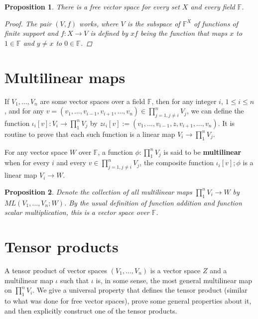 \documentclass[a4paper,14pt]{article}
\newtheorem*{prop}{Proposition}
\begin{document}
\begin{prop}
There is a free vector space for every set $X$ and every field $\mathbb{F}$.
\begin{proof}
    The pair $(V, f)$ works, where $V$ is the subspace of $\mathbb{F}^X$ of functions of finite support and $f: X \to V$ is defined by $xf$ being the function that maps $x$ to $1 \in \mathbb{F}$ and $y \neq x$ to $0 \in \mathbb{F}$.
\end{proof}
\end{prop}

\section{Multilinear maps}
If $V_1, \ldots, V_n$ are some vector spaces over a field $\mathbb{F}$, then for any integer $i$, $1 \leq i \leq n$, and for any $v = (v_1, \ldots, v_{i-1}, v_{i+1}, \ldots, v_n) \in \prod_{j=1, j \neq i}^n V_j$, we can define the function $\iota_i[v]: V_i \to \prod_1^n V_j$ by $z \iota_i[v] := (v_1, \ldots, v_{i-1}, z, v_{i+1}, \ldots, v_n)$. It is routine to prove that each such function is a linear map $V_i \to \prod_1^n V_j$.

For any vector space $W$ over $\mathbb{F}$, a function $\phi: \prod_1^n V_j$ is said to be \textbf{multilinear} when for every $i$ and every $v \in \prod_{j=1, j \neq i}^n V_j$, the composite function $\iota_i[v];\phi$ is a linear map $V_i \to W$.

\begin{prop}
Denote the collection of all multilinear maps $\prod_1^n V_i \to W$ by $ML(V_1, \ldots, V_n; W)$. By the usual definition of function addition and function scalar multiplication, this is a vector space over $\mathbb{F}$.
\end{prop}

\section{Tensor products}
A tensor product of vector spaces $(V_1, \ldots, V_n)$ is a vector space $Z$ and a multilinear map $\iota$ such that $\iota$ is, in some sense, the most general multilinear map on $\prod_1^n V_i$. We give a universal property that defines the tensor product (similar to what was done for free vector spaces), prove some general properties about it, and then explicitly construct one of the tensor products.
\end{document}
